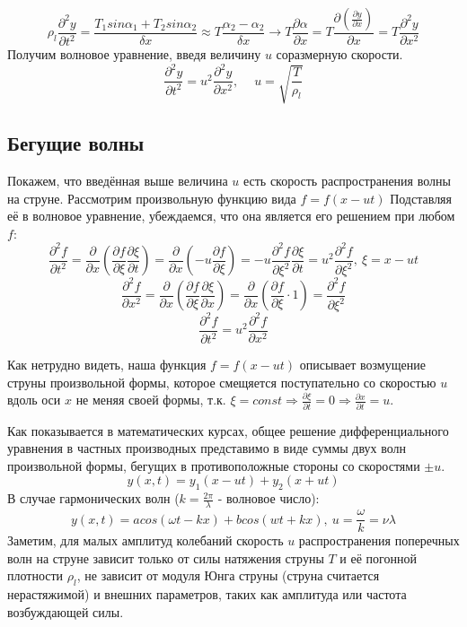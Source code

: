 \documentclass[a4paper, 12pt]{article}
\begin{document}
\[\rho_l \frac{\partial^2y}{\partial t^2}  = \frac{T_1sin\alpha_1 + T_2sin\alpha_2}{\delta x} \approx T\frac{\alpha_2 - \alpha_2}{\delta x} \rightarrow T\frac{\partial \alpha}{\partial x} = T\frac{\partial (\frac{\partial y}{\partial x})}{\partial x} = T \frac{\partial^2y}{\partial x^2}\]
Получим волновое уравнение, введя величину \(u\) соразмерную скорости.
\[\frac{\partial^2y}{\partial t^2} = u^2 \frac{\partial^2y}{\partial x^2}, \quad \ u = \sqrt{\frac{T}{\rho_l}} \]

\subsection{Бегущие волны}

Покажем, что введённая выше величина \(u\) есть скорость распространения волны на струне. Рассмотрим произвольную функцию вида \(f = f(x - ut)\) Подставляя её в волновое уравнение, убеждаемся, что она является его решением при любом \(f\):
\[\frac{\partial^2 f}{\partial t^2} = \frac{\partial}{\partial x} \left(\frac{\partial f}{\partial \xi}\frac{\partial \xi}{\partial t}\right) = \frac{\partial}{\partial x} \left(-u \frac{\partial f}{\partial \xi}\right) = -u \frac{\partial^2 f}{\partial \xi^2}\frac{\partial \xi}{\partial t} = u^2 \frac{\partial^2 f}{\partial \xi^2}, \ \xi =x-ut \]
\[ \frac{\partial^2 f}{\partial x^2} =  \frac{\partial}{\partial x} \left(\frac{\partial f}{\partial \xi}\frac{\partial \xi}{\partial x}\right) =  \frac{\partial}{\partial x} \left(\frac{\partial f}{\partial \xi} \cdot 1\right) = \frac{\partial^2 f}{\partial \xi^2}\]
\[\frac{\partial^2 f}{\partial t^2} = u^2 \frac{\partial^2 f}{\partial x^2}\]

Как нетрудно видеть, наша функция \(f = f(x - ut)\) описывает возмущение струны произвольной формы, которое смещяется поступательно со скоростью \(u\) вдоль оси \(x\) не меняя своей формы, т.к. \(\xi = const \Rightarrow \frac{\partial \xi}{\partial t} = 0 \Rightarrow \frac{\partial x}{\partial t} = u\).

Как показывается в математических курсах, общее решение дифференциального уравнения в частных производных представимо в виде суммы двух волн произвольной формы, бегущих в противоположные стороны со скоростями \(\pm u\).
\[y(x,t) = y_1(x -ut) + y_2(x+ut)\]
В случае гармонических волн (\(k = \frac{2\pi}{\lambda}\) - волновое число):
\[y(x,t) = acos(\omega t - kx) + bcos(wt+kx), \ u = \frac{\omega}{k} = \nu \lambda\]
Заметим, для малых амплитуд колебаний скорость \(u\) распространения поперечных волн на струне зависит только от силы натяжения струны \(T\) и её погонной
плотности \(\rho_l\), не зависит от модуля Юнга струны (струна считается нерастяжимой) и внешних параметров, таких как амплитуда или частота возбуждающей силы.
\end{document}

